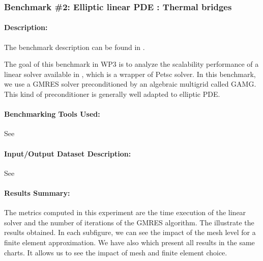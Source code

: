 \subsubsection{Benchmark \#2: Elliptic linear PDE : Thermal bridges}
\label{sec:WP3:Feelpp:benchmark:thermal_bridges}
\paragraph{Description:} %
The benchmark description can be found in
.

The goal of this benchmark in WP3 is to analyze the scalability performance of a linear solver
available in \Feelpp, which is a wrapper of Petsc solver.
In this benchmark, we use a GMRES solver preconditioned by an algebraic
multigrid called GAMG. This kind of preconditioner is generally well adapted to
elliptic PDE.


\paragraph{Benchmarking Tools Used:} %
See 

\paragraph{Input/Output Dataset Description:}
See 

\paragraph{Results Summary:}%

The metrics computed in this experiment are the time execution of the linear solver and the number of iterations of the GMRES algorithm.
The 
illustrate the results obtained. In each subfigure, we can see the impact of the
mesh level for a finite element approximation. We have also 
which present all results in the same charts. It allows us to see the impact of
mesh and finite element choice.

